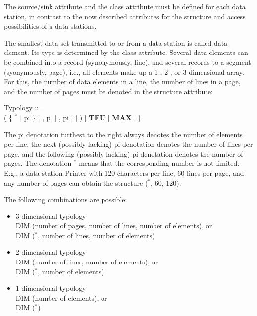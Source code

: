 The source/sink attribute and the class attribute must be defined for
each data station, in contrast to the now described attributes for the
structure and access possibilities of a data stations.

The smallest data set transmitted to or from a data station is called
data element. Its type is determined by the class attribute. Several
data elements can be combined into a record (synonymously, line), and
several records to a segment (syonymously, page), i.e., all elements
make up a 1-, 2-, or 3-dimensional array. For this, the number of data
elements in a line, the number of lines in a page, and the number of
pages must be denoted in the structure attribute:

Typology ::= \\
 ( \{ $^*$ $\mid$ pi \} [ , pi [ , pi ] ] ) [ {\bf TFU} [ {\bf MAX} ] ]

The pi denotation furthest to the right always denotes the number of
elements per line, the next (possibly lacking) pi denotation denotes
the number of lines per page, and the following (possibly lacking) pi
denotation denotes the number of pages. The denotation $^*$ means that
the corresponding number is not limited. E.g., a data station Printer
with 120 characters per line, 60 lines per page, and any number of pages
can obtain the structure ($^*$, 60, 120).

The following combinations are possible:
\begin{itemize}
\item 3-dimensional typology\\
DIM (number of pages, number of lines, number of elements), or\\
DIM ($^*$, number of lines, number of elements)
\item 2-dimensional typology\\
DIM (number of lines, number of elements), or\\
DIM ($^*$, number of elements)
\item 1-dimensional typology\\
DIM (number of elements), or\\
DIM ($^*$)
\end{itemize}

